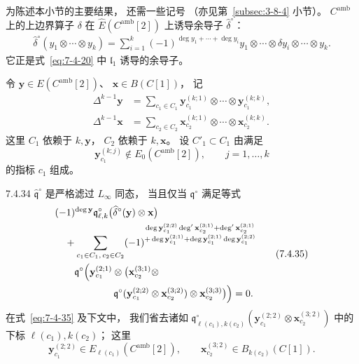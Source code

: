 
为陈述本小节的主要结果，
还需一些记号
（亦见第~\ref{subsec:3-8-4} 小节）。
$C^{\mathrm{amb}}$ 上的上边界算子
$\delta$ 在
$\widehat E(C^{\mathrm{amb}}[2])$
上诱导余导子 $\widehat\delta^{\circ}$：
\[
\begin{aligned}
\widehat\delta^{\circ}
(y_1\otimes\cdots\otimes y_k)
=\sum_{i=1}^{k}
(-1)^{\deg y_1+\cdots+\deg y_i}
y_1\otimes\cdots\otimes
\delta y_i\otimes\cdots\otimes y_k.
\end{aligned}
\]
它正是式~\eqref{eq:7-4-20}
中 $\mathfrak l_1$ 诱导的余导子。

令
$\mathbf y\in E(C^{\mathrm{amb}}[2])$、
$\mathbf x\in B(C[1])$，
记
\[
\begin{aligned}
\Delta^{k-1}\mathbf y
&=\sum_{c_1\in C_1}
\mathbf y_{c_1}^{(k;1)}
\otimes\cdots\otimes
\mathbf y_{c_1}^{(k;k)},\\
\Delta^{k-1}\mathbf x
&=\sum_{c_2\in C_2}
\mathbf x_{c_2}^{(k;1)}
\otimes\cdots\otimes
\mathbf x_{c_2}^{(k;k)}.
\end{aligned}
\]
这里 $C_1$ 依赖于 $k,\mathbf y$，
$C_2$ 依赖于 $k,\mathbf x$。
设 $C'_1\subset C_1$ 由满足
\[
\mathbf y_{c_1}^{(k;j)}
\notin E_0(C^{\mathrm{amb}}[2]),
\qquad j=1,\ldots,k
\]
的指标 $c_1$ 组成。

\begin{proposition}{7.4.34}\label{prop:7-4-34}
$\widehat{\mathfrak q}^{\circ}$
是严格滤过 $L_\infty$ 同态，
当且仅当 $\mathfrak q^{\circ}$
满足等式
\begin{equation}
\begin{aligned}
&(-1)^{\deg\mathbf y}
\mathfrak q^{\circ}_{\ell,k}
\bigl(\widehat\delta^{\circ}
(\mathbf y)\otimes\mathbf x\bigr)\\
&\quad+\sum_{c_1\in C_1,\,c_2\in C_2}
(-1)^{\substack{
\deg\mathbf y_{c_1}^{(2;2)}
\deg'\mathbf x_{c_2}^{(3;1)}
+\deg'\mathbf x_{c_2}^{(3;1)}\\
+\deg\mathbf y_{c_1}^{(2;1)}
+\deg\mathbf y_{c_1}^{(2;1)}
\deg\mathbf y_{c_1}^{(2;2)}}}\\
&\qquad
\mathfrak q^{\circ}\Bigl(
\mathbf y_{c_1}^{(2;1)}
\otimes\bigl(
\mathbf x_{c_2}^{(3;1)}\otimes\\
&\hspace{6em}
\mathfrak q^{\circ}
(\mathbf y_{c_1}^{(2;2)}
\otimes\mathbf x_{c_2}^{(3;2)})
\otimes\mathbf x_{c_2}^{(3;3)}
\bigr)\Bigr)=0.
\end{aligned}
\tag{7.4.35}\label{eq:7-4-35}
\end{equation}
在式~\eqref{eq:7-4-35}
及下文中，
我们省去诸如
$\mathfrak q^{\circ}_{
\ell(c_1),k(c_2)}
(\mathbf y_{c_1}^{(2;2)}
\otimes\mathbf x_{c_2}^{(3;2)})$
中的下标 $\ell(c_1),k(c_2)$；
这里
\[
\mathbf y_{c_1}^{(2;2)}
\in E_{\ell(c_1)}
(C^{\mathrm{amb}}[2]),
\qquad
\mathbf x_{c_2}^{(3;2)}
\in B_{k(c_2)}(C[1]).
\]
\end{proposition}

